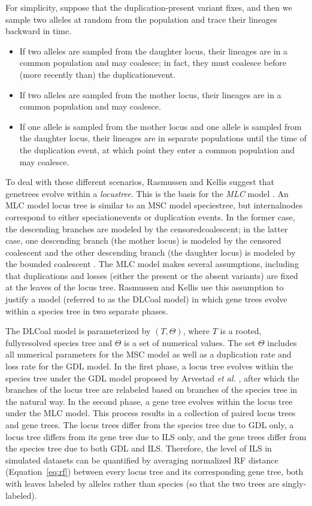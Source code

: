For simplicity, suppose that the duplication-present variant fixes, and then we sample two alleles at random from the population  and trace their \glspl{lineage} backward in time.
\begin{itemize}
	\item If two alleles are sampled from the daughter locus, their lineages are in a common population and may \gls{coalesce}; in fact, they must coalesce before (more recently than) the \gls{duplicationevent}.
	\item If two alleles are sampled from the mother locus, their lineages are in a common population and may coalesce.
	\item If one allele is sampled from the mother locus and one allele is sampled from the daughter locus, their lineages are in separate populations until the time of the duplication event, at which point they enter a common population and may coalesce.
\end{itemize}
To deal with these different scenarios, Rasmussen and Kellis \cite{rasmussen2012unified} suggest that \glspl{genetree} evolve within a \textit{\gls{locustree}}.
This is the basis for the \textit{\gls{MLC}} model \cite{rasmussen2012unified}.
An MLC model locus tree is similar to an MSC model \gls{speciestree}, but \glspl{internalnode} correspond to either \glspl{speciationevent} or duplication events.
In the former case, the descending branches are modeled by the \gls{censoredcoalescent}; in the latter case, one descending branch (the mother locus) is modeled by the censored coalescent and the other descending branch (the daughter locus) is modeled by the bounded coalescent \cite{rasmussen2012unified}.
The MLC model makes several assumptions, including that duplications and losses (either the present or the absent variants) are fixed at the leaves of the locus tree.
Rasmussen and Kellis \cite{rasmussen2012unified} use this assumption to justify a model (referred to as the DLCoal model) in which gene trees evolve within a species tree in two separate phases.

The DLCoal model is parameterized by $(T, \Theta)$, where $T$ is a \gls{rooted}, \gls{fullyresolved} species tree and $\Theta$ is a set of numerical values.
The set $\Theta$ includes all numerical parameters for the MSC model as well as a duplication rate and loss rate for the GDL model.
In the first phase, a locus tree evolves within the species tree under the GDL model proposed by Arvestad {\em et al.} \cite{arvestad2003bayesian}, after which the branches of the locus tree are relabeled based on branches of the species tree in the natural way.
In the second phase, a gene tree evolves within the locus tree under the MLC model.
This process results in a collection of paired locus trees and gene trees.
The locus trees differ from the species tree due to GDL only, a locus tree differs from its gene tree due to ILS only, and the gene trees differ from the species tree due to both GDL and ILS.
Therefore, the level of ILS in simulated datasets can be quantified by averaging normalized \gls{RF} distance (Equation~\ref{eq:rf}) between every locus tree and its corresponding gene tree, both with leaves labeled by alleles rather than species (so that the two trees are \gls{singly-labeled}).

